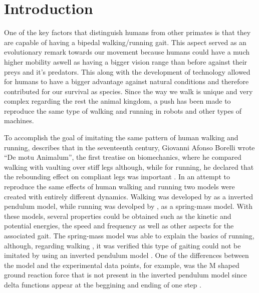 

\section{Introduction}
One of the key factors that distinguish humans from other primates is that they are capable of having a bipedal walking/running gait. This aspect served as an evolutionary remark towards our movement because humans could have a much higher mobility aswell as having a bigger vision range than before against their preys and it's predators. This along with the development of technology allowed for humans to have a bigger advantage against natural conditions and therefore contributed for our survival as species. Since the way we walk is unique and very complex \cite{Mochon&McMahon} regarding the rest the animal kingdom, a push has been made to reproduce the same type of walking and running in robots and other types of machines.


To accomplish the goal of imitating the same pattern of human walking and running, \cite{Seyfarth2006} describes that in the seventeenth century, Giovanni Afonso Borelli wrote ``De motu Animalum'', the first treatise on biomechanics, where he compared walking with vaulting over stiff legs although, while for running, he declared that the rebounding effect on compliant legs was important \cite{Borelli1685}. In an attempt to reproduce the same effects of human walking and running two models were created with entirely different dynamics. Walking was developed by \cite{Alexander1976,Mochon&McMahon,Cavagna1976} as a inverted pendulum model, while running was devolped by \cite{Blickhan1989,McMahon&Cheng1990}, as a spring-mass model. With these models, several properties could be obtained such as the kinetic and potential energies, the speed and frequency as well as other aspects for the associated gait. The spring-mass model was able to explain the basics of running, although, regarding walking , it was verified this type of gaiting could not be imitated by using an inverted pendulum model \cite{Full&Koditchek1999}. One of the differences between the model and the experimental data points, for example, was the M shaped ground reaction force that is not present in the inverted pendulum model since  delta functions appear at the beggining and ending of one step \cite{Pandy2003}.

